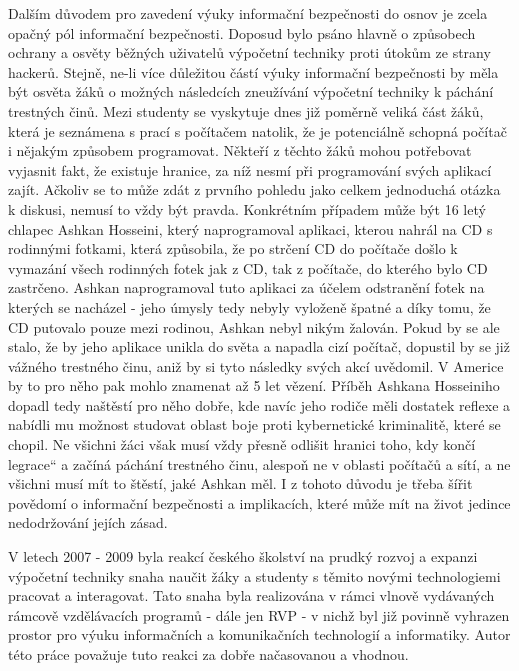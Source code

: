 \documentclass[a4paper, 11pt]{article}
\providecommand{\uv}[1]{\quotedblbase #1\textquotedblleft}
\begin{document}
Dalším důvodem pro zavedení výuky informační bezpečnosti do osnov je zcela opačný pól informační bezpečnosti. Doposud bylo psáno hlavně o způsobech ochrany a osvěty běžných uživatelů výpočetní techniky proti útokům ze strany hackerů. Stejně, ne-li více důležitou částí výuky informační bezpečnosti by měla být osvěta žáků o možných následcích zneužívání výpočetní techniky k páchání trestných činů. Mezi studenty se vyskytuje dnes již poměrně veliká část žáků, která je seznámena s prací s počítačem natolik, že je potenciálně schopná počítač i nějakým způsobem programovat. Někteří z těchto žáků mohou potřebovat vyjasnit fakt, že existuje hranice, za níž nesmí při programování svých aplikací zajít. Ačkoliv se to může zdát z prvního pohledu jako celkem jednoduchá otázka k diskusi, nemusí to vždy být pravda. Konkrétním případem může být 16 letý chlapec Ashkan Hosseini, který naprogramoval aplikaci, kterou nahrál na CD s rodinnými fotkami, která způsobila, že po strčení CD do počítače došlo k vymazání všech rodinných fotek jak z CD, tak z počítače, do kterého bylo CD zastrčeno. Ashkan naprogramoval tuto aplikaci za účelem odstranění fotek na kterých se nacházel \-- jeho úmysly tedy nebyly vyloženě špatné a díky tomu, že CD putovalo pouze mezi rodinou, Ashkan nebyl nikým žalován. Pokud by se ale stalo, že by jeho aplikace unikla do světa a napadla cizí počítač, dopustil by se již vážného trestného činu, aniž by si tyto následky svých akcí uvědomil. V Americe by to pro něho pak mohlo znamenat až 5 let vězení. Příběh Ashkana Hosseiniho dopadl tedy naštěstí pro něho dobře, kde navíc jeho rodiče měli dostatek reflexe a nabídli mu možnost studovat oblast boje proti kybernetické kriminalitě, které se chopil. Ne všichni žáci však musí vždy přesně odlišit hranici toho, kdy končí \uv{legrace} a začíná páchání trestného činu, alespoň ne v oblasti počítačů a sítí, a ne všichni musí mít to štěstí, jaké Ashkan měl. I z tohoto důvodu je třeba šířit povědomí o informační bezpečnosti a implikacích, které může mít na život jedince nedodržování jejích zásad. 

V letech 2007 \-- 2009 byla reakcí českého školství na prudký rozvoj a expanzi výpočetní techniky snaha naučit žáky a studenty s těmito novými technologiemi pracovat a interagovat. Tato snaha byla realizována v rámci vlnově vydávaných rámcově vzdělávacích programů \-- dále jen RVP \-- v nichž byl již povinně vyhrazen prostor pro výuku informačních a komunikačních technologií a informatiky. Autor této práce považuje tuto reakci za dobře načasovanou a vhodnou. 
\end{document}

